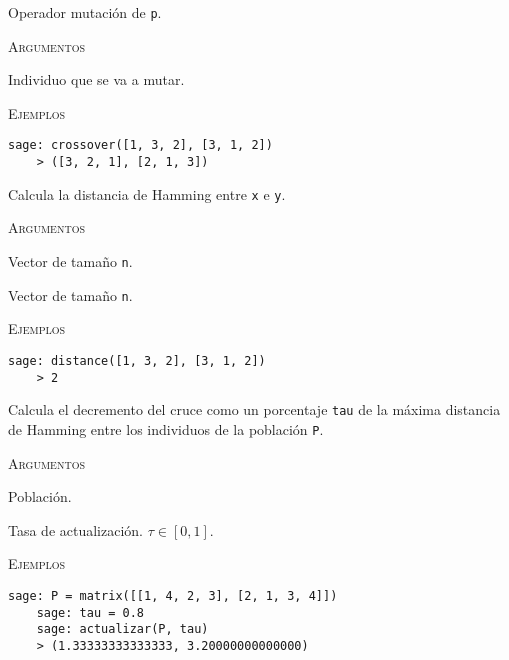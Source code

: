 \begin{description}[leftmargin=1em, font=\normalfont\ttfamily, style=nextline]
  Operador mutación de \texttt{p}.

  \textsc{Argumentos}
  \begin{description}[font=\normalfont\ttfamily]
    \item[p] Individuo que se va a mutar.
  \end{description}

  \textsc{Ejemplos}
  \begin{lstlisting}[gobble=4]
    sage: crossover([1, 3, 2], [3, 1, 2])
    > ([3, 2, 1], [2, 1, 3])
  \end{lstlisting}

  \item[distance(x, y)]

  Calcula la distancia de Hamming entre \texttt{x} e \texttt{y}.

  \textsc{Argumentos}
  \begin{description}[font=\normalfont\ttfamily]
    \item[x] Vector de tamaño \texttt{n}.
    \item[y] Vector de tamaño \texttt{n}.
  \end{description}

  \textsc{Ejemplos}
  \begin{lstlisting}[gobble=4]
    sage: distance([1, 3, 2], [3, 1, 2])
    > 2
  \end{lstlisting}

  \item[actualizar(P, tau)]

  Calcula el decremento del cruce como un porcentaje \texttt{tau} de la máxima distancia de Hamming entre los individuos de la población \texttt{P}.

  \textsc{Argumentos}
  \begin{description}[font=\normalfont\ttfamily]
    \item[P] Población.
    \item[tau] Tasa de actualización. $\tau \in [0,1]$.
  \end{description}

  \textsc{Ejemplos}
  \begin{lstlisting}[gobble=4]
    sage: P = matrix([[1, 4, 2, 3], [2, 1, 3, 4]])
    sage: tau = 0.8
    sage: actualizar(P, tau)
    > (1.33333333333333, 3.20000000000000)
  \end{lstlisting}
\end{description}
